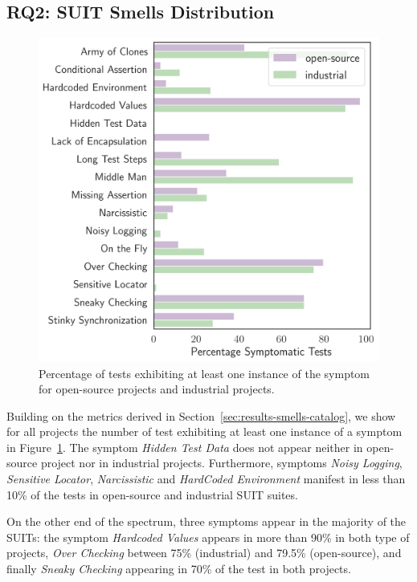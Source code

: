 \subsection{RQ2: SUIT Smells Distribution}
\label{sec:results-smells-diffusion}

\begin{figure}
\centering
\includegraphics[width=0.9\linewidth]{figures/smells/diffusion.png}
\caption{Percentage of tests exhibiting at least one instance of the symptom for open-source projects and industrial projects.}  
\label{fig:diffusion}
\end{figure}

Building on the metrics derived in Section~\ref{sec:results-smells-catalog}, we show for all projects the number of test exhibiting at least one instance of a symptom in Figure~\ref{fig:diffusion}. The symptom \emph{Hidden Test Data} does not appear neither in open-source project nor in industrial projects. Furthermore, symptoms \emph{Noisy Logging}, \emph{Sensitive Locator}, \emph{Narcissistic} and \emph{HardCoded Environment} manifest in less than 10\% of the tests in open-source and industrial SUIT suites. 

On the other end of the spectrum, three symptoms appear in the majority of the SUITs: the symptom \emph{Hardcoded Values} appears in more than 90\% in both type of projects, \emph{Over Checking} between 75\% (industrial) and 79.5\% (open-source), and finally \emph{Sneaky Checking} appearing in 70\% of the test in both projects.

